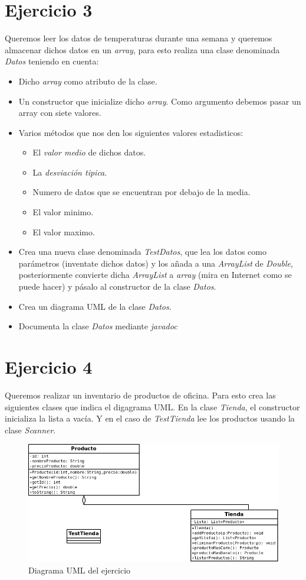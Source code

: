 \documentclass[4paper]{article}
\begin{document}
\section*{Ejercicio 3}
Queremos leer los datos de temperaturas durante una semana y queremos almacenar dichos datos en un \emph{array}, para esto realiza una clase denominada \emph{Datos} teniendo en cuenta:
\begin{itemize}
\item Dicho \emph{array} como atributo de la clase.
\item Un constructor que inicialize dicho \emph{array}. Como argumento debemos pasar un array con siete valores.
\item Varios métodos que nos den los siguientes valores estadisticos:
\begin{itemize}
\item El \emph{valor medio} de dichos datos.
\item La \emph{desviación tipica}.
\item Numero de datos que se encuentran por debajo de la media.
\item El valor minimo.
\item El valor maximo.
\end{itemize}
\item Crea una nueva clase denominada \emph{TestDatos}, que lea los datos como parámetros (inventate dichos datos) y los añada a una \emph{ArrayList} de \emph{Double}, posteriormente convierte dicha \emph{ArrayList} a \emph{array} (mira en Internet como se puede hacer) y pásalo al constructor de la clase \emph{Datos}.
\item Crea un diagrama UML de la clase \emph{Datos}.
\item Documenta la clase \emph{Datos} mediante \emph{javadoc}
\end{itemize}


\section*{Ejercicio 4}
Queremos realizar un inventario de productos de oficina. Para esto crea las siguientes clases que indica el digagrama UML. En la clase \emph{Tienda}, el constructor inicializa la lista a vacía. Y en el caso de \emph{TestTienda} lee los productos usando la clase \emph{Scanner}.
\begin{figure}
\includegraphics[scale=0.53]{ejercicio.png}
\caption{Diagrama UML del ejercicio}
\end{figure}
\end{document}
